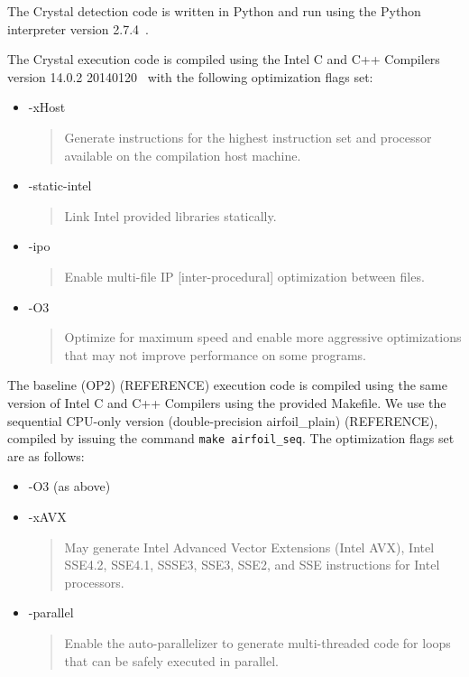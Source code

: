 The Crystal detection code is written in Python and run using the Python interpreter version 2.7.4~\cite{python}.

The Crystal execution code is compiled using the Intel\textregistered{} C and C++ Compilers version 14.0.2 20140120~\cite{icc} with the following optimization flags set:
\begin{itemize}
\item -xHost
\begin{quote}Generate instructions for the highest instruction set and processor available on the compilation host machine.\end{quote}
\item -static-intel
\begin{quote}Link Intel provided libraries statically.\end{quote}
\item -ipo
\begin{quote}Enable multi-file IP [inter-procedural] optimization between files.\end{quote}
\item -O3
\begin{quote}Optimize for maximum speed and enable more aggressive optimizations that may not improve performance on some programs.\end{quote}
\end{itemize}

The baseline (OP2) (REFERENCE) execution code is compiled using the same version of Intel\textregistered{} C and C++ Compilers using the provided Makefile. We use the sequential CPU-only version (double-precision airfoil\_plain) (REFERENCE), compiled by issuing the command \texttt{make airfoil\_seq}. The optimization flags set are as follows:
\begin{itemize}
\item -O3 (as above)
\item -xAVX
\begin{quote}May generate Intel\textregistered{} Advanced Vector Extensions (Intel\textregistered{} AVX), Intel\textregistered{} SSE4.2, SSE4.1, SSSE3, SSE3, SSE2, and SSE instructions for Intel\textregistered{} processors.\end{quote}
\item -parallel
\begin{quote}Enable the auto-parallelizer to generate multi-threaded code for loops that can be safely executed in parallel.\end{quote}
\end{itemize}


